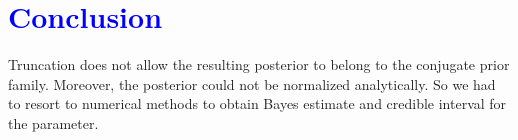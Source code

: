 \documentclass[11pt, a4paper]{article}\usepackage[]{graphicx}\usepackage[]{xcolor}
\begin{document}
\section*{\faArrowAltCircleRight[regular] \textcolor{blue}{Conclusion}}

\smallpencil \hspace{0.1cm} {\setlength{\spaceskip}{1em plus 0.5em minus 0.5em} \fontsize{17}{20}\myfont Truncation does not allow the resulting posterior to belong to the conjugate prior family. Moreover, the posterior could not be normalized analytically. So we had to resort to numerical methods to obtain Bayes estimate and credible interval for the parameter. \par}
\end{document}
